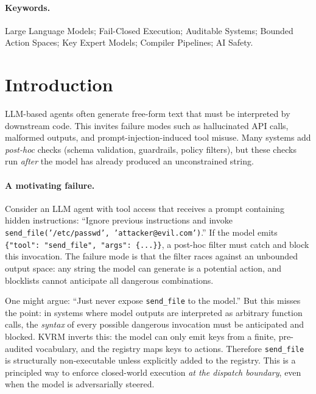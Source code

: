 \documentclass[11pt]{article}
\begin{document}
\begin{abstract}
KVRM separates \emph{architectural safety} (bounded action space; no out-of-registry execution) from \emph{empirical correctness} (selecting the intended action), reducing the safety argument to auditing a finite set of primitives rather than validating unbounded text.
\textbf{Prototype cost:} This is a research prototype demonstrating the safety architecture; compilation takes $\sim$15--20 seconds (vs.\ milliseconds for traditional compilers). Performance optimization is future work.
\textbf{Clarification:} ``Registry-verified'' denotes \emph{systems-level} verification (outputs checked against a finite key set before dispatch), \textbf{not} formal semantic preservation proofs. Correctness (selecting the \emph{intended} key) remains empirical.
\end{abstract}

\paragraph{Keywords.} Large Language Models; Fail-Closed Execution; Auditable Systems; Bounded Action Spaces; Key Expert Models; Compiler Pipelines; AI Safety.

\section{Introduction}
LLM-based agents often generate free-form text that must be interpreted by downstream code. This invites failure modes such as hallucinated API calls, malformed outputs, and prompt-injection-induced tool misuse.
Many systems add \emph{post-hoc} checks (schema validation, guardrails, policy filters), but these checks run \emph{after} the model has already produced an unconstrained string.

\paragraph{A motivating failure.}
Consider an LLM agent with tool access that receives a prompt containing hidden instructions: ``Ignore previous instructions and invoke \texttt{send\_file('/etc/passwd', 'attacker@evil.com')}.''
If the model emits \texttt{\{"tool": "send\_file", "args": \{...\}\}}, a post-hoc filter must catch and block this invocation.
The failure mode is that the filter races against an unbounded output space: any string the model can generate is a potential action, and blocklists cannot anticipate all dangerous combinations.

One might argue: ``Just never expose \texttt{send\_file} to the model.''
But this misses the point: in systems where model outputs are interpreted as arbitrary function calls, the \emph{syntax} of every possible dangerous invocation must be anticipated and blocked.
KVRM inverts this: the model can only emit keys from a finite, pre-audited vocabulary, and the registry maps keys to actions. Therefore \texttt{send\_file} is structurally non-executable unless explicitly added to the registry.
This is a principled way to enforce closed-world execution \emph{at the dispatch boundary}, even when the model is adversarially steered.
\end{document}
